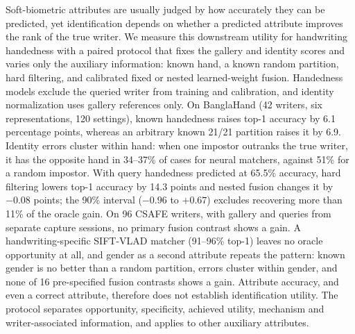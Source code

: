 Soft-biometric attributes are usually judged by how accurately they can be predicted, yet identification depends on whether a predicted attribute improves the rank of the true writer. We measure this downstream utility for handwriting handedness with a paired protocol that fixes the gallery and identity scores and varies only the auxiliary information: known hand, a known random partition, hard filtering, and calibrated fixed or nested learned-weight fusion. Handedness models exclude the queried writer from training and calibration, and identity normalization uses gallery references only. On BanglaHand (42 writers, six representations, 120 settings), known handedness raises top-1 accuracy by 6.1 percentage points, whereas an arbitrary known 21/21 partition raises it by 6.9. Identity errors cluster within hand: when one impostor outranks the true writer, it has the opposite hand in 34--37\% of cases for neural matchers, against 51\% for a random impostor. With query handedness predicted at 65.5\% accuracy, hard filtering lowers top-1 accuracy by 14.3 points and nested fusion changes it by $-0.08$ points; the 90\% interval ($-0.96$ to $+0.67$) excludes recovering more than 11\% of the oracle gain. On 96 CSAFE writers, with gallery and queries from separate capture sessions, no primary fusion contrast shows a gain. A handwriting-specific SIFT-VLAD matcher (91--96\% top-1) leaves no oracle opportunity at all, and gender as a second attribute repeats the pattern: known gender is no better than a random partition, errors cluster within gender, and none of 16 pre-specified fusion contrasts shows a gain. Attribute accuracy, and even a correct attribute, therefore does not establish identification utility. The protocol separates opportunity, specificity, achieved utility, mechanism and writer-associated information, and applies to other auxiliary attributes.
